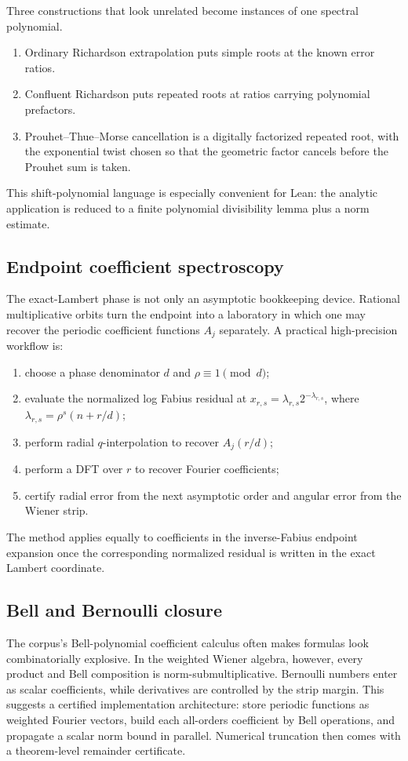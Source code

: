 \documentclass[11pt]{article}
\numberwithin{equation}{section}
\theoremstyle{definition}
\theoremstyle{remark}
\begin{document}
Three constructions that look unrelated become instances of one spectral polynomial.
\begin{enumerate}
\item Ordinary Richardson extrapolation puts simple roots at the known error ratios.
\item Confluent Richardson puts repeated roots at ratios carrying polynomial prefactors.
\item Prouhet--Thue--Morse cancellation is a digitally factorized repeated root, with the
      exponential twist chosen so that the geometric factor cancels before the Prouhet sum
      is taken.
\end{enumerate}
This shift-polynomial language is especially convenient for Lean: the analytic application
is reduced to a finite polynomial divisibility lemma plus a norm estimate.

\subsection{Endpoint coefficient spectroscopy}

The exact-Lambert phase is not only an asymptotic bookkeeping device.  Rational
multiplicative orbits turn the endpoint into a laboratory in which one may recover the
periodic coefficient functions $A_j$ separately.  A practical high-precision workflow is:
\begin{enumerate}
\item choose a phase denominator $d$ and $\rho\equiv1\pmod d$;
\item evaluate the normalized log Fabius residual at
$x_{r,s}=\lambda_{r,s}2^{-\lambda_{r,s}}$, where
$\lambda_{r,s}=\rho^s(n+r/d)$;
\item perform radial $q$-interpolation to recover $A_j(r/d)$;
\item perform a DFT over $r$ to recover Fourier coefficients;
\item certify radial error from the next asymptotic order and angular error from the
      Wiener strip.
\end{enumerate}
The method applies equally to coefficients in the inverse-Fabius endpoint expansion once
the corresponding normalized residual is written in the exact Lambert coordinate.

\subsection{Bell and Bernoulli closure}

The corpus's Bell-polynomial coefficient calculus often makes formulas look combinatorially
explosive.  In the weighted Wiener algebra, however, every product and Bell composition is
norm-submultiplicative.  Bernoulli numbers enter as scalar coefficients, while derivatives
are controlled by the strip margin.  This suggests a certified implementation architecture:
store periodic functions as weighted Fourier vectors, build each all-orders coefficient by
Bell operations, and propagate a scalar norm bound in parallel.  Numerical truncation then
comes with a theorem-level remainder certificate.
\end{document}
